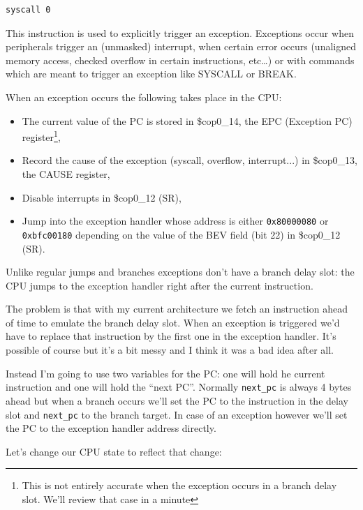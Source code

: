 \documentclass[a4paper]{article}
\newcommand{\code}[1] {\texttt{#1}}
\begin{document}
\begin{lstlisting}[language=assembly]
syscall 0
\end{lstlisting}

This instruction is used to explicitly trigger an
exception. Exceptions occur when peripherals trigger an (unmasked)
interrupt, when certain error occurs (unaligned memory access,
checked overflow in certain instructions, etc\dots{}) or with commands
which are meant to trigger an exception like SYSCALL or BREAK.

When an exception occurs the following takes place in the CPU:

\begin{itemize}
  \item The current value of the PC is stored in \$cop0\_14, the EPC
    (Exception PC) register\footnote{This is not entirely accurate
    when the exception occurs in a branch delay slot. We'll review
    that case in a minute},
  \item Record the cause of the exception (syscall, overflow,
    interrupt...) in \$cop0\_13, the CAUSE register,
  \item Disable interrupts in \$cop0\_12 (SR),
  \item Jump into the exception handler whose address is either
    \code{0x80000080} or \code{0xbfc00180} depending on the value of
    the BEV field (bit 22) in \$cop0\_12 (SR).
\end{itemize}

Unlike regular jumps and branches exceptions don't have a branch delay
slot: the CPU jumps to the exception handler right after the current
instruction.

The problem is that with my current architecture we fetch an
instruction ahead of time to emulate the branch delay slot. When an
exception is triggered we'd have to replace that instruction by the
first one in the exception handler. It's possible of course but it's a
bit messy and I think it was a bad idea after all.

Instead I'm going to use two variables for the PC: one will hold he
current instruction and one will hold the ``next PC''. Normally
\code{next\_pc} is always 4 bytes ahead but when a branch occurs we'll set
the PC to the instruction in the delay slot and \code{next\_pc} to the
branch target. In case of an exception however we'll set the PC to
the exception handler address directly.

Let's change our CPU state to reflect that change:
\end{document}
